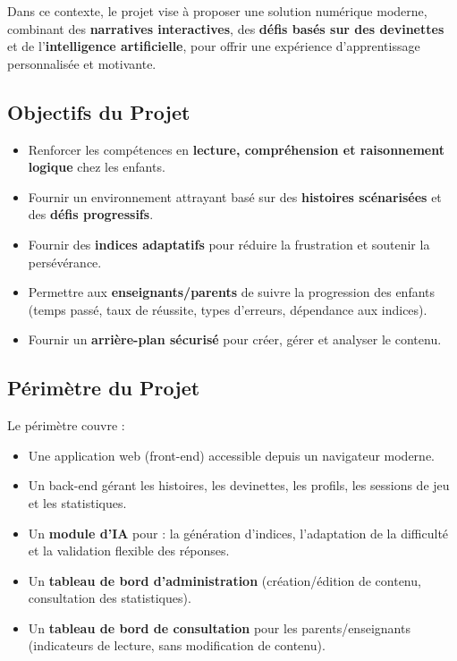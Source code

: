 \documentclass[12pt,a4paper]{article}
\begin{document}
Dans ce contexte, le projet vise à proposer une solution numérique moderne, combinant des \textbf{narratives interactives}, des \textbf{défis basés sur des devinettes} et de l'\textbf{intelligence artificielle}, pour offrir une expérience d'apprentissage personnalisée et motivante.

\subsection{Objectifs du Projet}

\begin{itemize}
    \item Renforcer les compétences en \textbf{lecture, compréhension et raisonnement logique} chez les enfants.
    \item Fournir un environnement attrayant basé sur des \textbf{histoires scénarisées} et des \textbf{défis progressifs}.
    \item Fournir des \textbf{indices adaptatifs} pour réduire la frustration et soutenir la persévérance.
    \item Permettre aux \textbf{enseignants/parents} de suivre la progression des enfants (temps passé, taux de réussite, types d'erreurs, dépendance aux indices).
    \item Fournir un \textbf{arrière-plan sécurisé} pour créer, gérer et analyser le contenu.
\end{itemize}

\subsection{Périmètre du Projet}

Le périmètre couvre :
\begin{itemize}
    \item Une application web (front-end) accessible depuis un navigateur moderne.
    \item Un back-end gérant les histoires, les devinettes, les profils, les sessions de jeu et les statistiques.
    \item Un \textbf{module d'IA} pour : la génération d'indices, l'adaptation de la difficulté et la validation flexible des réponses.
    \item Un \textbf{tableau de bord d'administration} (création/édition de contenu, consultation des statistiques).
    \item Un \textbf{tableau de bord de consultation} pour les parents/enseignants (indicateurs de lecture, sans modification de contenu).
\end{itemize}
\newpage
\end{document}
